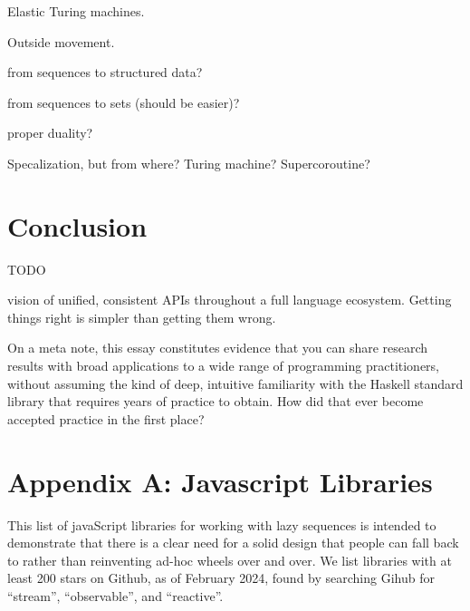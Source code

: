 \documentclass[sigplan,screen,10pt,anonymous,review]{acmart}
\begin{document}
Elastic Turing machines.

Outside movement.

from sequences to structured data?

from sequences to sets (should be easier)?

proper duality?

Specalization, but from where? Turing machine? Supercoroutine?

\section{Conclusion}\label{conclusion}

TODO

vision of unified, consistent APIs throughout a full language ecosystem. Getting things right is simpler than getting them wrong.

On a meta note, this essay constitutes evidence that you can share research results with broad applications to a wide range of programming practitioners, without assuming the kind of deep, intuitive familiarity with the Haskell standard library that requires years of practice to obtain. How did that ever become accepted practice in the first place?

\section{Appendix A: Javascript Libraries}\label{wtfjs}

This list of javaScript libraries for working with lazy sequences is intended to demonstrate that there is a clear need for a solid design that people can fall back to rather than reinventing ad-hoc wheels over and over. We list libraries with at least 200 stars on Github, as of February 2024, found by searching Gihub for ``stream'', ``observable'', and ``reactive''.
\end{document}
